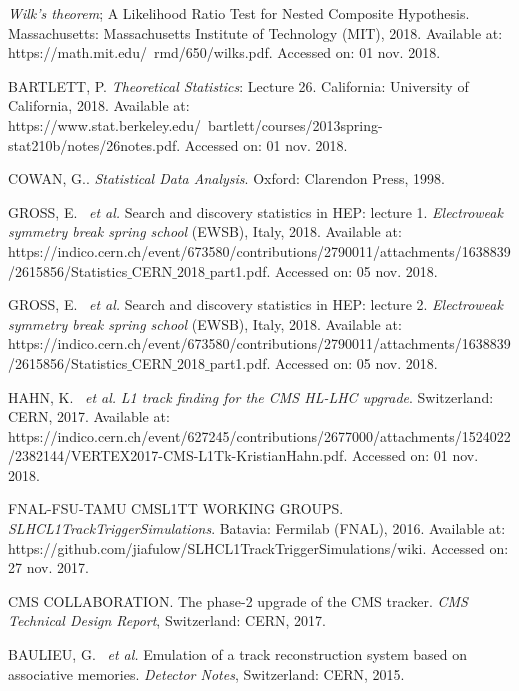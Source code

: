 \begin{thebibliography}{}
\textit{Wilk’s theorem}; A Likelihood Ratio Test for Nested Composite Hypothesis. Massachusetts: Massachusetts Institute of Technology (MIT), 2018. Available at: https://math.mit.edu/~rmd/650/wilks.pdf. Accessed on: 01 nov. 2018.

BARTLETT, P. \textit{Theoretical Statistics}: Lecture 26. California: University of California, 2018. Available at: https://www.stat.berkeley.edu/~bartlett/courses/2013spring-stat210b/notes/26notes.pdf. Accessed on: 01 nov. 2018.

COWAN, G.. \textit{Statistical Data Analysis}. Oxford: Clarendon Press, 1998.

GROSS, E. ~\textit{et al.} Search and discovery statistics in HEP: lecture 1. \textit{Electroweak symmetry break spring school} (EWSB), Italy, 2018. Available at: https://indico.cern.ch/event/673580/contributions/2790011/attachments/1638839/2615856/Statistics$\_$CERN$\_$2018$\_$part1.pdf. Accessed on: 05 nov. 2018.

GROSS, E. ~\textit{et al.} Search and discovery statistics in HEP: lecture 2. \textit{Electroweak symmetry break spring school} (EWSB), Italy, 2018. Available at: https://indico.cern.ch/event/673580/contributions/2790011/attachments/1638839/2615856/Statistics$\_$CERN$\_$2018$\_$part1.pdf. Accessed on: 05 nov. 2018.


HAHN, K. ~\textit{et al.} \textit{L1 track finding for the CMS HL-LHC upgrade}. Switzerland: CERN, 2017. Available at: https://indico.cern.ch/event/627245/contributions/2677000/attachments/1524022/2382144/VERTEX2017-CMS-L1Tk-KristianHahn.pdf. Accessed on: 01 nov. 2018.

FNAL-FSU-TAMU CMSL1TT WORKING GROUPS. \textit{SLHCL1TrackTriggerSimulations}. Batavia: Fermilab (FNAL), 2016. Available at: https://github.com/jiafulow/SLHCL1TrackTriggerSimulations/wiki. Accessed on: 27 nov. 2017.

CMS COLLABORATION. The phase-2 upgrade of the CMS tracker. \textit{CMS Technical Design Report}, Switzerland: CERN, 2017.

BAULIEU, G. ~\textit{et al.} Emulation of a track reconstruction system based on associative memories. \textit{Detector Notes}, Switzerland: CERN, 2015.


\end{thebibliography}
